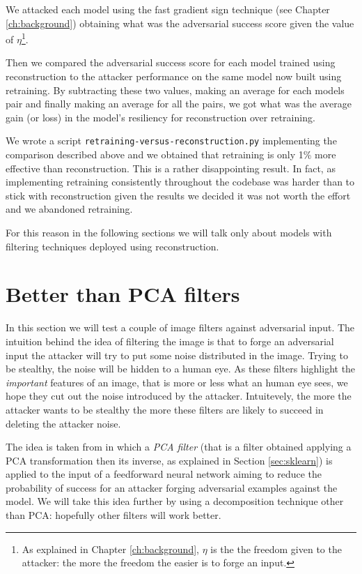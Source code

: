 We attacked each model using the fast gradient sign technique (see
Chapter \ref{ch:background}) obtaining what was the adversarial success
score given the value of $\eta$\footnote{As explained in Chapter
  \ref{ch:background}, $\eta$ is the the freedom given to the attacker:
  the more the freedom the easier is to forge an input.}.

Then we compared the adversarial success score for each model trained
using reconstruction to the attacker performance on the same model now
built using retraining. By subtracting these two values, making an
average for each models pair and finally making an average for all the
pairs, we got what was the average gain (or loss) in the model's
resiliency for reconstruction over retraining.

We wrote a script \texttt{retraining-versus-reconstruction.py}
implementing the comparison described above and we obtained that
retraining is only 1\% more effective than reconstruction. This is a
rather disappointing result. In fact, as implementing retraining
consistently throughout the codebase was harder than to stick with
reconstruction given the results we decided it was not worth the effort
and we abandoned retraining.

For this reason in the following sections we will talk only about models
with filtering techniques deployed using reconstruction.

\section{Better than PCA filters}

In this section we will test a couple of image filters against
adversarial input. The intuition behind the idea of filtering the image
is that to forge an adversarial input the attacker will try to put some
noise distributed in the image. Trying to be stealthy, the noise will be
hidden to a human eye. As these filters highlight the \emph{important}
features of an image, that is more or less what an human eye sees, we
hope they cut out the noise introduced by the attacker. Intuitevely,
the more the attacker wants to be stealthy the more these filters are
likely to succeed in deleting the attacker noise.

The idea is taken from \cite{bhagoji2018enhancing} in which a \emph{PCA
  filter} (that is a filter obtained applying a PCA transformation then
its inverse, as explained in Section \ref{sec:sklearn}) is applied to
the input of a feedforward neural network aiming to reduce the
probability of success for an attacker forging adversarial examples
against the model. We will take this idea further by using a
decomposition technique other than PCA: hopefully other filters will
work better.

